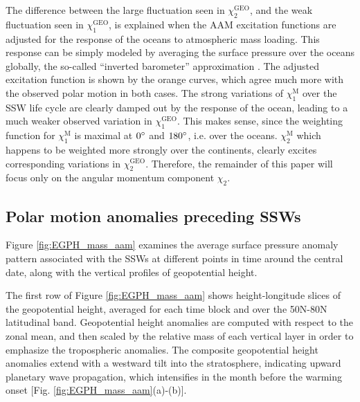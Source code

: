 \documentclass[draft,jgrga]{agutex}
\begin{document}
\begin{article}
The difference between the large fluctuation seen in $\chi_2^{\text{GEO}}$, and the weak fluctuation seen in $\chi_1^{\text{GEO}}$, is explained when the AAM excitation functions are adjusted for the response of the oceans to atmospheric  {mass} loading.  
This response can be simply modeled  {by averaging the surface pressure over the oceans globally, the so-called ``inverted barometer'' approximation} \citep{wunschstammer1997}.
The adjusted excitation function is shown by the orange curves, which agree much more with the observed polar motion in both cases.
The strong variations of $\chi_1^{\text{M}}$ over the SSW life cycle are clearly damped out by the response of the ocean, leading to a much weaker observed variation in $\chi_1^{\text{GEO}}$. 
This makes sense, since the weighting function for  $\chi_1^{\text{M}}$ is maximal at $0^\circ$ and $180 ^\circ$, i.e. over the oceans.
$\chi_2^{\text{M}}$ which happens to be weighted more strongly over the continents, clearly excites corresponding variations in $\chi_2^{\text{GEO}}$.
 {Therefore, the remainder of this paper will focus only on the angular momentum component} $\chi_2$.

\subsection{Polar motion anomalies preceding SSWs}

Figure \ref{fig:EGPH_mass_aam} examines the  {average surface pressure anomaly pattern associated with the SSWs at different points in time around the central date, along with the vertical profiles of geopotential height.}  

The first row of Figure \ref{fig:EGPH_mass_aam} shows height-longitude slices of the geopotential height, averaged for each time block and over the 50N-80N latitudinal band.
 {Geopotential height anomalies are computed with respect to the zonal mean, and then} scaled by the relative mass of each vertical layer in order to emphasize the tropospheric anomalies. 
The composite geopotential height anomalies extend with a westward tilt into the stratosphere, indicating upward planetary wave propagation, which intensifies in the month before the warming onset [Fig. \ref{fig:EGPH_mass_aam}(a)-(b)].


\end{article}
\end{document}
